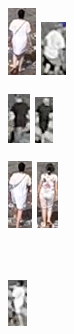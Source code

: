 \begin{figure}
    \newlength{\fpheight}
    \setlength{\fpheight}{2.5cm}


    \centering
    
    \begin{subfigure}[b]{0.3\textwidth}
         \centering
         \includegraphics[height=\fpheight]{img/fp_0_a.png}
         \includegraphics[height=\fpheight]{img/fp_0_b.png}
    \end{subfigure}
    \begin{subfigure}[b]{0.3\textwidth}
         \centering
         \includegraphics[height=\fpheight]{img/fp_1_a.png}
         \includegraphics[height=\fpheight]{img/fp_1_b.png}
    \end{subfigure}
    \begin{subfigure}[b]{0.3\textwidth}
         \centering
         \includegraphics[height=\fpheight]{img/fp_2_a.png}
         \includegraphics[height=\fpheight]{img/fp_2_b.png}
    \end{subfigure}\\
    \vspace{0.5cm}
    \begin{subfigure}[b]{0.3\textwidth}
         \centering
         \includegraphics[height=\fpheight]{img/fp_3_a.png}

\end{subfigure}
\end{figure}
